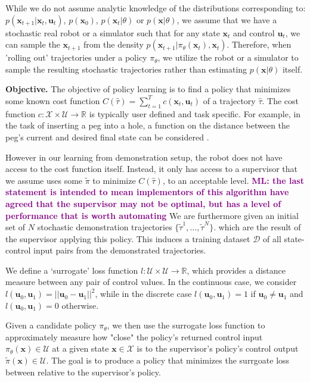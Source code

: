 \documentclass[10pt, conference]{ieeeconf}      %
\newcommand{\bu}{\mathbf{u}}
\newcommand{\bx}{\mathbf{x}}
\newcommand{\mlnote}[1]{\ifthenelse{\boolean{include-notes}}%
 {\textcolor{purple}{\textbf{ML: #1}}}{}}
\begin{document}
While we do not assume analytic knowledge of the distributions corresponding to: $p(\bx_{t+1}|\bx_t,\bu_t)$, $p(\bx_0)$, $p(\bx_t|
\theta)$ or $p(\bx|\theta)$, we assume that we have a stochastic real robot or a simulator such that for any state
$\bx_t$ and control $\bu_t$, we can sample the $\bx_{t+1}$ from the density $p(\bx_{t+1}|\pi_{\theta}(\bx_t),\bx_t)$. 
Therefore, when 'rolling out' trajectories under a policy
$\pi_{\theta}$, we utilize the robot or a simulator to sample the resulting stochastic trajectories rather than
estimating $p(\bx|\theta)$ itself.

\noindent\textbf{Objective.} The objective of  policy learning is to find a policy that minimizes some known cost function $C(\hat{\tau}) = \sum^T_{t=1} c(\bx_t,\bu_t)$ of a trajectory $\hat{\tau}$. The cost function $c:\mathcal{X}\times \mathcal{U}\to \mathbb{R}$ is typically user defined and task specific. 
For example, in the task of inserting a peg into a hole, a function on the distance between the peg's current and desired final state can
be considered \cite{levine2015end}.  

However in our learning from demonstration setup, the robot does not have access to the cost function itself. Instead, it only has access to 
a supervisor that we assume uses some $\tilde{\pi}$ to minimize $C(\hat{\tau})$, to an acceptable level. \mlnote{the last statement is intended to mean implementors of this algorithm have agreed that the supervisor may not be optimal, but has a level of performance that is worth automating} We are furthermore given
an initial set of $N$ stochastic demonstration trajectories $\lbrace \tilde{\tau}^1,...,\tilde{\tau}^N \rbrace$. 
which are the result of the supervisor applying this policy. This induces a training dataset $\mathcal{D}$ of all state-control input pairs from the demonstrated trajectories. 

We define a `surrogate' loss function $l:\mathcal{U}\times \mathcal{U}\to \mathbb{R}$, which provides a distance
measure between any pair of control values. In the continuous case, we consider $l(\bu_0,\bu_1) = ||\bu_0-\bu_1||^2$,
while in the discrete case $l(\bu_0,\bu_1) = 1$ if $\bu_0 \neq \bu_1$ and $l(\bu_0, \bu_1)=0$ otherwise.

Given a candidate policy $\pi_{\theta}$, we then use the surrogate loss function to approximately measure how "close" the policy's
returned control input $\pi_{\theta}(\bx)\in \mathcal{U}$ at a given state $\bx\in \mathcal{X}$ is to the supervisor's policy's control output
$\tilde{\pi}(\bx)\in \mathcal{U}$. The goal is to produce a policy that minimizes the surrgoate loss between relative to the supervisor's policy.
\end{document}
